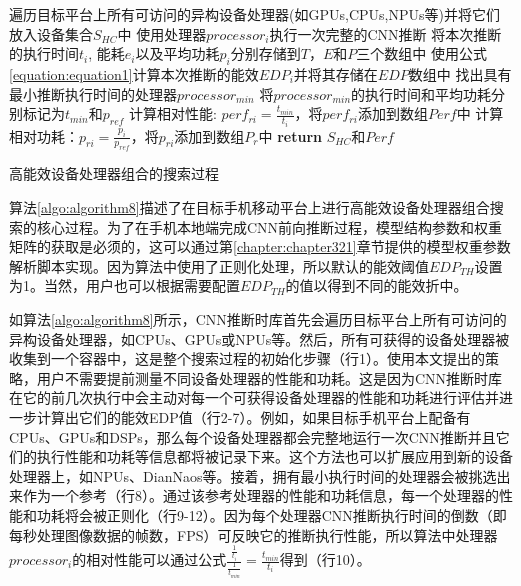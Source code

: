 \begin{algorithm}[htbp]
  \small
  \SetAlgoLined
    \begin{spacing}{0.8}
    遍历目标平台上所有可访问的异构设备处理器(如GPUs,CPUs,NPUs等)并将它们放入设备集合$S_{HC}$中\;
     {
        使用处理器$processor_i$执行一次完整的CNN推断\;
        将本次推断的执行时间$t_i$, 能耗$e_i$以及平均功耗$p_i$分别存储到$T$，$E$和$P$三个数组中\;
        使用公式\ref{equation:equation1}计算本次推断的能效$EDP_i$并将其存储在$EDP$数组中\;
    }
    找出具有最小推断执行时间的处理器$processor_{min}$\;
    将$processor_{min}$的执行时间和平均功耗分别标记为$t_{min}$和$p_{ref}$\;
     {
    计算相对性能: $perf_{ri} = \frac{t_{min}}{t_i}$，将$perf_{ri}$添加到数组$Perf$中\;
    计算相对功耗：$p_{ri} = \frac{p_{i}}{p_{ref}}$，将$p_{ri}$添加到数组$P_r$中\;
    }
    \textbf{return} $S_{HC}$和$Perf$\;
   \end{spacing}
  \caption{高能效设备处理器组合的搜索过程}
  \label{algo:algorithm8}
\end{algorithm}

算法\ref{algo:algorithm8}描述了在目标手机移动平台上进行高能效设备处理器组合搜索的核心过程。为了在手机本地端完成CNN前向推断过程，模型结构参数和权重矩阵的获取是必须的，这可以通过第\ref{chapter:chapter321}章节提供的模型权重参数解析脚本实现。因为算法中使用了正则化处理，所以默认的能效阈值$EDP_{TH}$设置为1。当然，用户也可以根据需要配置$EDP_{TH}$的值以得到不同的能效折中。

如算法\ref{algo:algorithm8}所示，CNN推断时库首先会遍历目标平台上所有可访问的异构设备处理器，如CPUs、GPUs或NPUs等。然后，所有可获得的设备处理器被收集到一个容器中，这是整个搜索过程的初始化步骤（行1）。使用本文提出的策略，用户不需要提前测量不同设备处理器的性能和功耗。这是因为CNN推断时库在它的前几次执行中会主动对每一个可获得设备处理器的性能和功耗进行评估并进一步计算出它们的能效EDP值（行2-7）。例如，如果目标手机平台上配备有CPUs、GPUs和DSPs，那么每个设备处理器都会完整地运行一次CNN推断并且它们的执行性能和功耗等信息都将被记录下来。这个方法也可以扩展应用到新的设备处理器上，如NPUs、DianNaos\cite{chen2014diannao}等。接着，拥有最小执行时间的处理器会被挑选出来作为一个参考（行8）。通过该参考处理器的性能和功耗信息，每一个处理器的性能和功耗将会被正则化（行9-12）。因为每个处理器CNN推断执行时间的倒数（即每秒处理图像数据的帧数，FPS）可反映它的推断执行性能，所以算法中处理器$processor_i$的相对性能可以通过公式$\frac{\frac{1}{t_i}}{\frac{1}{t_{min}}}=\frac{t_{min}}{t_i}$得到（行10）。

